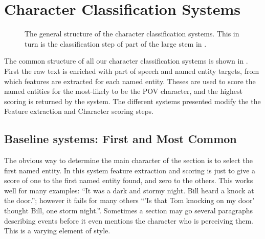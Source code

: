 \documentclass[11pt,a4paper]{article}
\begin{document}
\section{Character Classification Systems}
\begin{figure*}
	\caption{The general structure of the character classification systems. This in turn is the classification step of part of the large stem in . \label{fig:classify}}
\end{figure*}
The common structure of all our character classification systems is shown in .
First the raw text is enriched with part of speech and named entity targets,
from which features are extracted for each named entity.
Theses are used to score the named entities for the most-likely to be the POV character, and the highest scoring is returned by the system.
The different systems presented modify the the Feature extraction and Character scoring steps.


\subsection{Baseline systems: First and Most Common}
The obvious way to determine the main character of the section is to select the first named entity.
In this system feature extraction and scoring is just to give a score of one to the first named entity found, and zero to the others.
This works well for many examples: ``It was a dark and stormy night. Bill heard a knock at the door.''; however it fails for many others ``'Is that Tom knocking on my door' thought Bill, one storm night.''.
Sometimes a section  may go several paragraphs describing events before it even mentions the character who is perceiving them.
This is a varying element of style.
\end{document}
